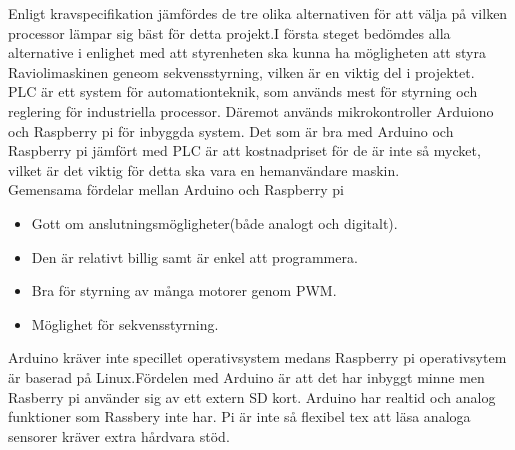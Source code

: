 Enligt kravspecifikation jämfördes de tre olika alternativen för att välja på vilken processor lämpar sig bäst för detta projekt.I första steget bedömdes alla alternative i enlighet med att styrenheten ska kunna ha  mögligheten att styra Raviolimaskinen geneom sekvensstyrning, vilken är en viktig del i projektet.\\


PLC är ett system för automationteknik, som används mest för styrning och reglering för industriella processor. Däremot används mikrokontroller Arduiono och Raspberry pi för inbyggda system. Det som är bra med Arduino och Raspberry pi jämfört med PLC är att kostnadpriset för de är inte så mycket, vilket är det viktig för detta ska vara en hemanvändare maskin.\\

Gemensama fördelar mellan Arduino och Raspberry pi
\begin{itemize}
	\item Gott om anslutningsmögligheter(både analogt och digitalt).
	\item Den är relativt billig samt är enkel att programmera.
	\item Bra för styrning av många motorer genom PWM.
	\item Möglighet för sekvensstyrning.
\end{itemize}

 Arduino kräver inte specillet operativsystem medans Raspberry pi operativsytem är baserad på Linux.Fördelen med  Arduino är att det har inbyggt minne men Rasberry pi använder sig av ett extern SD kort. Arduino har realtid och analog funktioner som Rassbery inte har. Pi är inte så flexibel tex att läsa analoga sensorer kräver extra hårdvara stöd.

